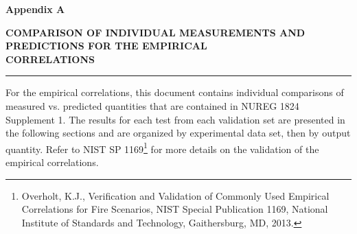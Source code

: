 \documentclass[12pt, titlepage, twoside]{article}
\begin{document}
\thispagestyle{empty}

\huge
\noindent \textbf{Appendix A}

\vspace{0.5em}
\LARGE
\noindent \textbf{COMPARISON OF INDIVIDUAL MEASUREMENTS AND PREDICTIONS FOR THE EMPIRICAL \\ CORRELATIONS}

\normalsize

\vspace{1.5em}
\hrule
\vspace{1.0em}

For the empirical correlations, this document contains individual comparisons of measured vs. predicted quantities that are contained in NUREG 1824 Supplement 1. The results for each test from each validation set are presented in the following sections and are organized by experimental data set, then by output quantity. Refer to NIST SP 1169\footnote{Overholt, K.J., Verification and Validation of Commonly Used Empirical Correlations for Fire Scenarios, NIST Special Publication 1169, National Institute of Standards and Technology, Gaithersburg, MD, 2013.} for more details on the validation of the empirical correlations.

\clearpage
{}
\thispagestyle{empty}
\tableofcontents

\appendix

\setcounter{section}{0}


\end{document}
